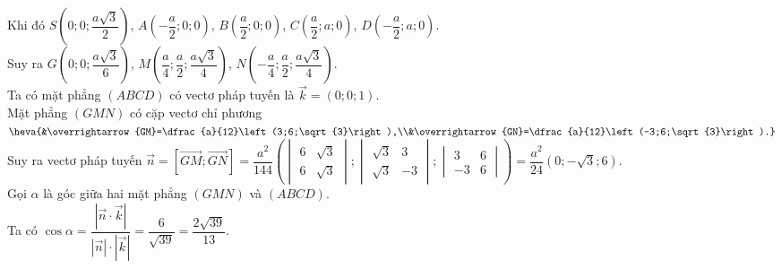 \begin{ex}
{\begin{center}
		\end{center}
		Khi đó
		$S\left(0;0;\dfrac{a\sqrt{3}}{2} \right)$, $A\left(-\dfrac{a}{2};0;0 \right)$, $B\left(\dfrac{a}{2};0;0 \right)$, $C\left(\dfrac{a}{2};a;0 \right)$, $D\left(-\dfrac{a}{2};a;0 \right)$.\\
		Suy ra $G\left(0;0;\dfrac{a\sqrt{3}}{6}\right)$, $M\left(\dfrac{a}{4};\dfrac{a}{2};\dfrac{a\sqrt{3}}{4}\right)$, $N\left(-\dfrac{a}{4};\dfrac{a}{2};\dfrac{a\sqrt{3}}{4}\right)$.\\
		Ta có mặt phẳng $(ABCD)$ có vectơ pháp tuyến là $\overrightarrow{k}=(0;0;1)$.\\
		Mặt phẳng $(GMN)$ có cặp vectơ chỉ phương
		$\heva{&\overrightarrow{GM}=\dfrac{a}{12}\left(3;6;\sqrt{3}\right),\\&\overrightarrow{GN}=\dfrac{a}{12}\left(-3;6;\sqrt{3}\right).}$\\
		Suy ra vectơ pháp tuyến $\overrightarrow{n}=\left[\overrightarrow{GM};\overrightarrow{GN}\right] 
		=\dfrac{a^2}{144}
		\left(
		\begin{vmatrix}
			6&\sqrt{3}\\6&\sqrt{3}
		\end{vmatrix};
		\begin{vmatrix}
			\sqrt{3}&3\\\sqrt{3}&-3
		\end{vmatrix};
		\begin{vmatrix}
			3&6\\-3&6
		\end{vmatrix}
		\right)
		=\dfrac{a^2}{24}\left(0;-\sqrt{3};6\right)$.\\
		Gọi $\alpha$ là góc giữa hai mặt phẳng $(GMN)$ và $(ABCD)$.\\
		Ta có
		$\cos\alpha=\dfrac{\left|\overrightarrow{n}\cdot\overrightarrow{k}\right|}{\left|{\overrightarrow{n}}\right|\cdot\left|{\overrightarrow{k}}\right|}=\dfrac{6}{\sqrt{39}}=\dfrac{2\sqrt{39}}{13}$.
	}
\end{ex}


